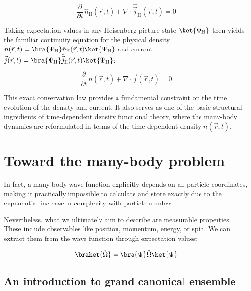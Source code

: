 \begin{equation}
\frac{\partial}{\partial t}\,\hat{n}_\mathrm{H}(\vec{r},t)+\nabla\cdot\hat{\vec j}_\mathrm{H}(\vec{r},t)=0
\label{continuity_operator}
\end{equation}

Taking expectation values in any Heisenberg-picture state $\ket{\Psi_\mathrm{H}}$ then yields the familiar continuity equation for the physical density $n(\vec{r},t)=\bra{\Psi_\mathrm{H}}\hat{n}_\mathrm{H}(\vec{r},t)\ket{\Psi_\mathrm{H}}$
and current $\vec{j}(\vec{r},t)=\bra{\Psi_\mathrm{H}}\hat{\vec{j}}_\mathrm{H}(\vec{r},t)\ket{\Psi_\mathrm{H}}$:

\begin{equation}
    \frac{\partial}{\partial t}\,n(\vec{r},t)+\nabla\cdot\vec{j}(\vec{r},t)=0
\label{continuity_expectation}
\end{equation}

This exact conservation law provides a fundamental constraint on the time evolution of the density and current. It also serves as one of the basic structural ingredients of time-dependent density functional theory, where the many-body dynamics are reformulated in terms of the time-dependent density $n(\vec{r},t)$.

\newpage
\section{Toward the many-body problem}
\label{sec:toward_many_body_problem}

In fact, a many-body wave function explicitly depends on all particle coordinates, making it practically impossible to calculate and store exactly due to the exponential increase in complexity with particle number.

Nevertheless, what we ultimately aim to describe are measurable properties.
These include observables like position, momentum, energy, or spin.
We can extract them from the wave function through expectation values:

\begin{equation}
    \braket{\hat{\Omega}} = \bra{\Psi}\hat{\Omega}\ket{\Psi}
\label{obvious}
\end{equation}

\subsection{An introduction to grand canonical ensemble}

